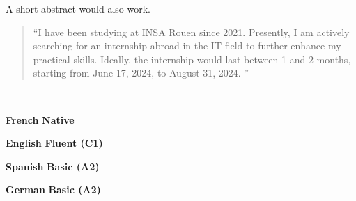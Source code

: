 \documentclass[10pt,a4paper,ragged2e,withhyper]{./AltaCV/altacv}
\begin{document}
\begin{paracol}{2}
  \divider

  A short abstract would also work.

  \medskip

  \switchcolumn


  \begin{quote}
    ``I have been studying at INSA Rouen since 2021.
    Presently, I am actively searching for an internship abroad in the IT field to further enhance my practical skills.
    Ideally, the internship would last between 1 and 2 months, starting from June 17, 2024, to August 31, 2024.
    ''
  \end{quote}



  \divider


  \divider



  \\

  \divider

  \cvtag{\LaTeX}


  \textcolor{emphasis}{\textbf{French}} \hfill \textbf{Native}\\

  \divider

  \textcolor{emphasis}{\textbf{English}} \hfill \textbf{Fluent (C1)}\\

  \divider

  \textcolor{emphasis}{\textbf{Spanish}} \hfill \textbf{Basic (A2)}\\

  \divider

  \textcolor{emphasis}{\textbf{German}} \hfill \textbf{Basic (A2)}\\

\end{paracol}
\end{document}
